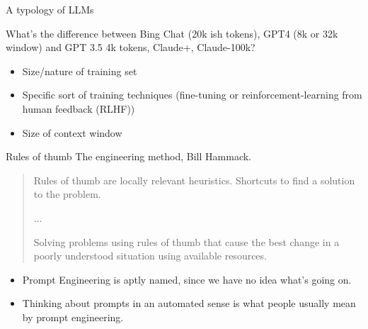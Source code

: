 \documentclass[aspectratio=169]{beamer}
\begin{document}
\begin{frame}{A typology of LLMs}

What's the difference between Bing Chat (20k ish tokens), GPT4 (8k or 32k window) and GPT 3.5 4k tokens, Claude+, Claude-100k?

\begin{itemize}
    \item Size/nature of training set
    \item Specific sort of training techniques (fine-tuning or reinforcement-learning from human feedback (RLHF))
    \item Size of context window
\end{itemize}
    
\end{frame}
\begin{frame}{Rules of thumb}
   The engineering method, Bill Hammack.
   \begin{quote}
       Rules of thumb are locally relevant heuristics. Shortcuts to find a solution to the problem. \parencite[p 13]{Hammack2023-ra}
    
        ...
        
       Solving problems using rules of thumb that cause the best change in a poorly understood situation using available resources. \parencite[p 19]{Hammack2023-ra}
   \end{quote}
    \begin{itemize}
        \item Prompt Engineering is aptly named, since we have no idea what's going on.
        \item Thinking about prompts in an automated sense is what people usually mean by prompt engineering. 
    \end{itemize}
\end{frame}
\end{document}
